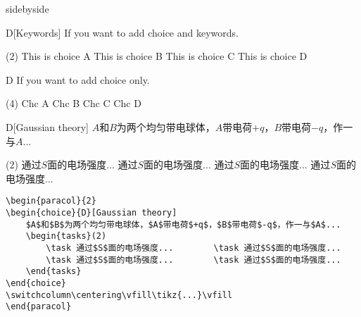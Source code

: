 \begin{tcblisting}{sidebyside}
\begin{choice}{D}[Keywords]
If you want to add choice and keywords.
\begin{tasks}(2) %
    \task This is choice A  \task This is choice B
    \task This is choice C  \task This is choice D
\end{tasks}
\end{choice}
\begin{choice}{D}
If you want to add choice only.
\begin{tasks}(4) %
    \task Chc A \task Chc B \task Chc C \task Chc D
\end{tasks}
\end{choice}
\end{tcblisting}

\begin{paracol}{2}
    \begin{choice}{D}[Gaussian theory]
        $A$和$B$为两个均匀带电球体，$A$带电荷$+q$，$B$带电荷$-q$，作一与$A$...
        \begin{tasks}(2)
            \task 通过$S$面的电场强度...        \task 通过$S$面的电场强度...
            \task 通过$S$面的电场强度...        \task 通过$S$面的电场强度...
        \end{tasks}
    \end{choice}
    \switchcolumn
    \centering\vfill
    \vfill
\end{paracol}
\begin{verbatim}
\begin{paracol}{2}
\begin{choice}{D}[Gaussian theory]
    $A$和$B$为两个均匀带电球体，$A$带电荷$+q$，$B$带电荷$-q$，作一与$A$...
    \begin{tasks}(2)
        \task 通过$S$面的电场强度...        \task 通过$S$面的电场强度...
        \task 通过$S$面的电场强度...        \task 通过$S$面的电场强度...
    \end{tasks}
\end{choice}
\switchcolumn\centering\vfill\tikz{...}\vfill
\end{paracol}
\end{verbatim}

